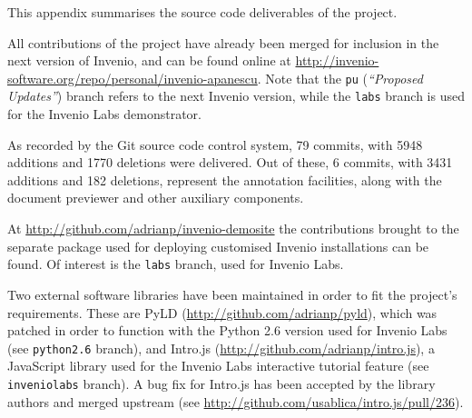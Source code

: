 
This appendix summarises the source code deliverables of the project.

All contributions of the project have already been merged for inclusion in
the next version of Invenio, and can be found online at
\url{http://invenio-software.org/repo/personal/invenio-apanescu}. Note that the
\texttt{pu} (\textit{``Proposed Updates''}) branch refers to the next Invenio
version, while the \texttt{labs} branch is used for the Invenio Labs
demonstrator.

As recorded by the Git source code control system, 79 commits, with 5948
additions and 1770 deletions were delivered. Out of these, 6 commits, with
3431 additions and 182 deletions, represent the annotation facilities, along
with the document previewer and other auxiliary components.

At \url{http://github.com/adrianp/invenio-demosite} the contributions
brought to the separate package used for deploying customised Invenio
installations can be found. Of interest is the \texttt{labs} branch, used for
Invenio Labs.

Two external software libraries have been maintained in order to fit the
project's requirements. These are PyLD (\url{http://github.com/adrianp/pyld}),
which was patched in order to function with the Python 2.6 version used for
Invenio Labs (see \texttt{python2.6} branch), and Intro.js
(\url{http://github.com/adrianp/intro.js}), a JavaScript library used for the
Invenio Labs interactive tutorial feature (see \texttt{inveniolabs} branch).
A bug fix for Intro.js has been accepted by the library authors and merged
upstream (see \url{http://github.com/usablica/intro.js/pull/236}).
